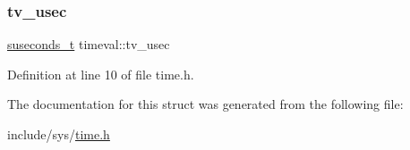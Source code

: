 \subsubsection{\texorpdfstring{tv\_usec}{tv\_usec}}
{\footnotesize\ttfamily \mbox{\hyperlink{sys_2time_8h_a909167c659c8a090775b22285c2b8519}{suseconds\+\_\+t}} timeval\+::tv\+\_\+usec}



Definition at line 10 of file time.\+h.



The documentation for this struct was generated from the following file\+:\begin{DoxyCompactItemize}
\item 
include/sys/\mbox{\hyperlink{sys_2time_8h}{time.\+h}}\end{DoxyCompactItemize}
